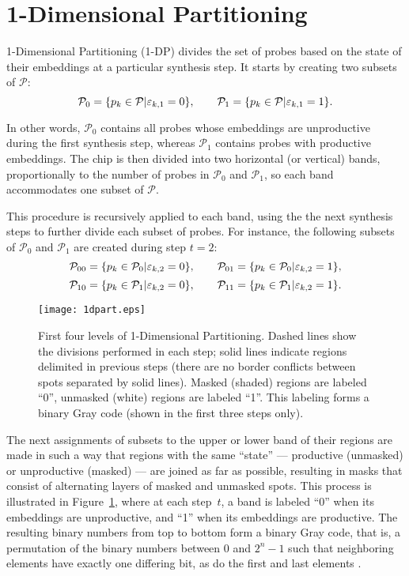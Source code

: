 \section{1-Dimensional Partitioning}
\label{sec:part_1d}

1-Dimensional Partitioning (1-DP) divides the set of probes based on the state
of their embeddings at a particular synthesis step. It starts by creating two
subsets of $\mathcal{P}$:
\[
\mathcal{P}_0 = \{ p_k \in \mathcal{P} | \varepsilon_{k,1} = 0 \},
\qquad
\mathcal{P}_1 = \{ p_k \in \mathcal{P} | \varepsilon_{k,1} = 1 \}.
\]

In other words, $\mathcal{P}_0$ contains all probes whose embeddings are
unproductive during the first synthesis step, whereas $\mathcal{P}_1$ contains
probes with productive embeddings. The chip is then divided into two horizontal
(or vertical) bands, proportionally to the number of probes in $\mathcal{P}_0$
and $\mathcal{P}_1$, so each band accommodates one subset of $\mathcal{P}$.

This procedure is recursively applied to each band, using the the next synthesis
steps to further divide each subset of probes. For instance, the following
subsets of $\mathcal{P}_0$ and $\mathcal{P}_1$ are created during step $t=2$:
\[
\mathcal{P}_{00} = \{ p_k \in \mathcal{P}_0 | \varepsilon_{k,2} = 0 \},
\qquad
\mathcal{P}_{01} = \{ p_k \in \mathcal{P}_0 | \varepsilon_{k,2} = 1 \},
\]
\[
\mathcal{P}_{10} = \{ p_k \in \mathcal{P}_1 | \varepsilon_{k,2} = 0 \},
\qquad
\mathcal{P}_{11} = \{ p_k \in \mathcal{P}_1 | \varepsilon_{k,2} = 1 \}.
\]

\begin{figure}\centering
\texttt{[image: 1dpart.eps]}
\caption{\label{fig:1dpart}%
  First four levels of 1-Dimensional Partitioning. Dashed lines show the
  divisions performed in each step; solid lines indicate regions delimited in
  previous steps (there are no border conflicts between spots separated by
  solid lines). Masked (shaded) regions are labeled ``0'',
  unmasked (white) regions are labeled ``1''. This labeling forms
  a binary Gray code (shown in the first three steps only).}
\end{figure}

The next assignments of subsets to the upper or lower band of their regions are
made in such a way that regions with the same ``state'' --- productive
(unmasked) or unproductive (masked) --- are joined as far as possible, resulting
in masks that consist of alternating layers of masked and unmasked spots. This
process is illustrated in Figure~\ref{fig:1dpart}, where at each step~$t$, a
band is labeled ``0'' when its embeddings are unproductive, and ``1'' when its
embeddings are productive. The resulting binary numbers from top to bottom form
a binary Gray code, that is, a permutation of the binary numbers between 0 and
$2^n - 1$ such that neighboring elements have exactly one differing bit, as do
the first and last elements \citep{Kreher1999}.

